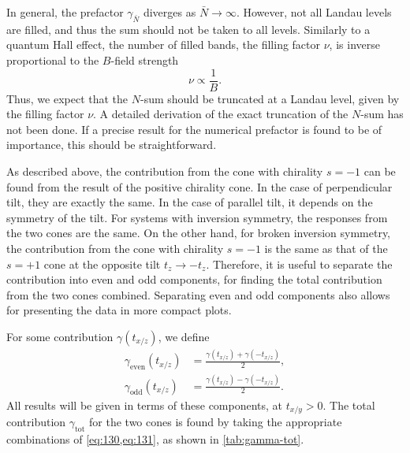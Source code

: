 In general, the prefactor \( \gamma_{\bar{N}} \) diverges as $\bar{N} \to \infty$.
However, not all Landau levels are filled, and thus the sum should not be taken to all levels.
Similarly to a quantum Hall effect, the number of filled bands, the filling factor $\nu $, is inverse proportional to the $B$-field strength
\begin{equation}
  \nu \propto \frac{1}{B}.
\end{equation}
Thus, we expect that the $N$-sum should be truncated at a Landau level, given by the filling factor $\nu $.
A detailed derivation of the exact truncation of the $N$-sum has not been done.
If a precise result for the numerical prefactor is found to be of importance, this should be straightforward.

As described above, the contribution from the cone with chirality \( s = -1 \) can be found from the result of the positive chirality cone.
In the case of perpendicular tilt, they are exactly the same.
In the case of parallel tilt, it depends on the symmetry of the tilt.
For systems with inversion symmetry, the responses from the two cones are the same.
On the other hand, for broken inversion symmetry, the contribution from the cone with chirality \( s=-1 \) is the same as that of the \( s=+1 \) cone at the opposite tilt \( t_z \to - t_z \).
Therefore, it is useful to separate the contribution into even and odd components, for finding the total contribution from the two cones combined.
Separating even and odd components also allows for presenting the data in more compact plots.

For some contribution \( \gamma(t_{x /z}) \), we define
\begin{align}
  \gamma_{\text{even}}(t_{x/z}) &= \frac{\gamma(t_{x/z}) + \gamma(-t_{x/z})}{2}\label{eq:130},\\
  \gamma_{\text{odd}}(t_{x/z}) &= \frac{\gamma(t_{x/z}) - \gamma(-t_{x/z})}{2}\label{eq:131}.
\end{align}
All results will be given in terms of these components, at \( t_{x /y} > 0 \).
The total contribution \( \gamma_{\text{tot}} \) for the two cones is found by taking the appropriate combinations of \cref{eq:130,eq:131}, as shown in \cref{tab:gamma-tot}.

